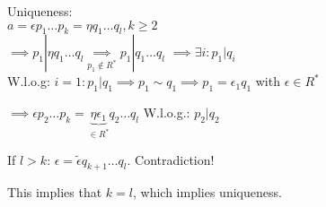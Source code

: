 Uniqueness:\\
$a = \epsilon p_1 \ldots p_k = \eta q_1 \ldots q_l, k\geq 2$\\
$\implies p_1 | \eta q_1 \ldots q_l \underset{p_1 \not\in R^{*}}{\implies}{} p_1 | q_1 \ldots q_l$ 
$\implies \exists i: p_1 |q_i$ \\ W.l.o.g: $i = 1: p_1|q_1 \implies p_1 \sim q_1 \implies p_1 = \epsilon_1 q_1$ with $\epsilon \in R^{*}$

$\implies\epsilon p_2 \ldots p_k = \underbrace{\eta \epsilon_1}_{\in R^{*}} q_2 \ldots q_l$ W.l.o.g.: $p_2|q_2$

If $l > k$: $\epsilon = \tilde{\epsilon} q_{k+1} \ldots q_l$. Contradiction!

This implies that $k=l$, which implies uniqueness.


